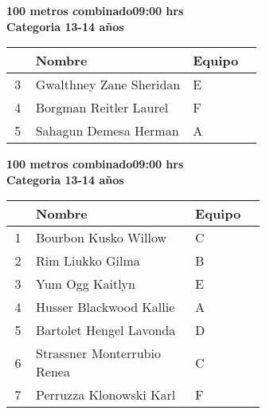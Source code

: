 \begin{minipage}{0.95\linewidth}\vspace{0.5cm} 
\begin{flushleft}
\textbf{
\hspace{-0.15cm}100 metros combinado\hspace{1.5cm}09:00 hrs \\Categoria 13-14 años}\vspace{-0.2cm} 
\end{flushleft}
\begin{tabular}{cp{0.63\linewidth}l}
\hline
& \textbf{Nombre} & \textbf{Equipo} \\ \hline
3 & Gwalthney Zane Sheridan & E \\ 
4 & Borgman Reitler Laurel & F \\ 
5 & Sahagun Demesa Herman & A \\ 
\end{tabular}
\end{minipage}
\begin{minipage}{0.95\linewidth}\vspace{0.5cm} 
\begin{flushleft}
\textbf{
\hspace{-0.15cm}100 metros combinado\hspace{1.5cm}09:00 hrs \\Categoria 13-14 años}\vspace{-0.2cm} 
\end{flushleft}
\begin{tabular}{cp{0.63\linewidth}l}
\hline
& \textbf{Nombre} & \textbf{Equipo} \\ \hline
1 & Bourbon Kusko Willow & C \\ 
2 & Rim Liukko Gilma & B \\ 
3 & Yum Ogg Kaitlyn & E \\ 
4 & Husser Blackwood Kallie & A \\ 
5 & Bartolet Hengel Lavonda & D \\ 
6 & Strassner Monterrubio Renea & C \\ 
7 & Perruzza Klonowski Karl & F \\ 
\end{tabular}
\end{minipage}
